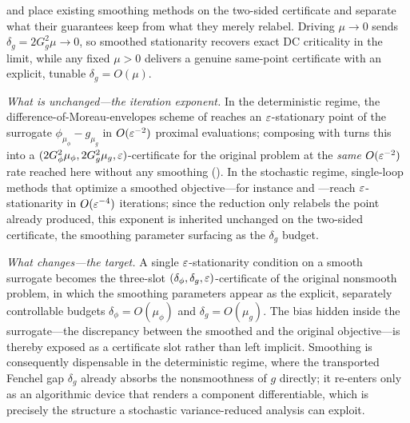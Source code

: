 \begin{remark}
\label{rem:smoothing-native-limit}
 and  place existing
smoothing methods on the two-sided certificate and separate what their
guarantees keep from what they merely relabel. Driving $\mu\to0$ sends
$\delta_g=2G_g^2\mu\to0$, so smoothed stationarity recovers exact DC criticality
in the limit, while any fixed $\mu>0$ delivers a genuine same-point certificate
with an explicit, tunable $\delta_g=O(\mu)$.

\emph{What is unchanged---the iteration exponent.} In the deterministic regime,
the difference-of-Moreau-envelopes scheme of \citet{sun2023algorithms} reaches
an $\varepsilon$-stationary point of the surrogate $\phi_{\mu_\phi}-g_{\mu_g}$ in
$O(\varepsilon^{-2})$ proximal evaluations; composing with 
turns this into a $(2G_\phi^2\mu_\phi,2G_g^2\mu_g,\varepsilon)$-certificate for the
original problem at the \emph{same} $O(\varepsilon^{-2})$ rate reached here without any
smoothing (). In the stochastic regime,
single-loop methods that optimize a smoothed objective---for instance
\citet{chayti2025stochastic} and \citet{hu2024single}---reach $\varepsilon$-stationarity
in $O(\varepsilon^{-4})$ iterations; since the reduction only relabels the point already
produced, this exponent is inherited unchanged on the two-sided certificate, the
smoothing parameter surfacing as the $\delta_g$ budget.

\emph{What changes---the target.} A single $\varepsilon$-stationarity condition on a
smooth surrogate becomes the three-slot $(\delta_\phi,\delta_g,\varepsilon)$-certificate
of the original nonsmooth problem, in which the smoothing parameters appear as
the explicit, separately controllable budgets $\delta_\phi=O(\mu_\phi)$ and
$\delta_g=O(\mu_g)$. The bias hidden inside the surrogate---the discrepancy
between the smoothed and the original objective---is thereby exposed as a
certificate slot rather than left implicit. Smoothing is consequently dispensable
in the deterministic regime, where the transported Fenchel gap $\delta_g$ already
absorbs the nonsmoothness of $g$ directly; it re-enters only as an algorithmic
device that renders a component differentiable, which is precisely the structure
a stochastic variance-reduced analysis can exploit.
\end{remark}


